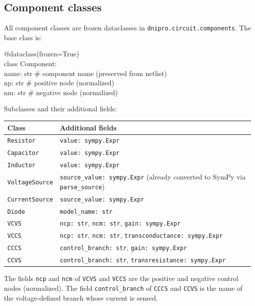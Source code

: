\documentclass[11pt,a4paper]{article}
\newcommand{\code}[1]{\texttt{#1}}
\newenvironment{apisig}{%
  \begin{trivlist}\item\relax\ttfamily\small
}{%
  \end{trivlist}
}
\begin{document}
\subsection{Component classes}
\label{api:components}

All component classes are frozen dataclasses in \code{dnipro.circuit.components}.
The base class is:

\begin{apisig}
@dataclass(frozen=True) \\
class Component: \\
\quad name: str   \# component name (preserved from netlist) \\
\quad np: str     \# positive node (normalized) \\
\quad nm: str     \# negative node (normalized)
\end{apisig}

Subclasses and their additional fields:

\begin{longtable}{p{}p{}}
\toprule
Class & Additional fields \\
\midrule
\code{Resistor}      & \code{value: sympy.Expr} \\
\code{Capacitor}     & \code{value: sympy.Expr} \\
\code{Inductor}      & \code{value: sympy.Expr} \\
\code{VoltageSource} & \code{source\_value: sympy.Expr}
                       (already converted to SymPy via \code{parse\_source}) \\
\code{CurrentSource} & \code{source\_value: sympy.Expr} \\
\code{Diode}         & \code{model\_name: str} \\
\code{VCVS}          & \code{ncp: str}, \code{ncm: str}, \code{gain: sympy.Expr} \\
\code{VCCS}          & \code{ncp: str}, \code{ncm: str},
                       \code{transconductance: sympy.Expr} \\
\code{CCCS}          & \code{control\_branch: str}, \code{gain: sympy.Expr} \\
\code{CCVS}          & \code{control\_branch: str},
                       \code{transresistance: sympy.Expr} \\
\bottomrule
\end{longtable}

The fields \code{ncp} and \code{ncm} of \code{VCVS} and \code{VCCS} are the
positive and negative control nodes (normalized).
The field \code{control\_branch} of \code{CCCS} and \code{CCVS} is the name
of the voltage-defined branch whose current is sensed.
\end{document}
